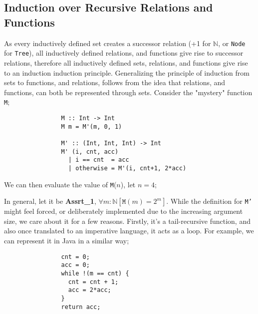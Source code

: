 \documentclass[a4paper, 12pt]{article}
\newcommand{\proofeq}[3]{$#1$ & = $#2$ & \hfill #3 \smallskip \\}
\begin{document}
        \subsection*{Induction over Recursive Relations and Functions}
            As every inductively defined set creates a successor relation (+1 for $\mathbb{N}$, or \texttt{Node} for \texttt{Tree}), all inductively defined relations, and functions give rise to successor relations, therefore all inductively defined sets, relations, and functions give rise to an induction induction principle. Generalizing the principle of induction from sets to functions, and relations, follows from the idea that relations, and functions, can both be represented through sets. Consider the "mystery" function \texttt{M};
            \begin{lstlisting}
                M :: Int -> Int
                M m = M'(m, 0, 1)

                M' :: (Int, Int, Int) -> Int
                M' (i, cnt, acc)
                  | i == cnt  = acc
                  | otherwise = M'(i, cnt+1, 2*acc)
            \end{lstlisting}
            We can then evaluate the value of \texttt{M}($n$), let $n = 4$;
            In general, let it be \textbf{Assrt\_1}, $\forall m : \mathbb{N} [\texttt{M}(m) = 2^m]$. While the definition for \texttt{M'} might feel forced, or deliberately implemented due to the increasing argument size, we care about it for a few reasons. Firstly, it's a tail-recursive function, and also once translated to an imperative language, it acts as a loop. For example, we can represent it in Java in a similar way;
            \begin{lstlisting}
                cnt = 0;
                acc = 0;
                while !(m == cnt) {
                  cnt = cnt + 1;
                  acc = 2*acc;
                }
                return acc;
            \end{lstlisting}
\end{document}
